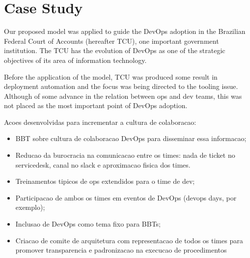 \section{Case Study}

Our proposed model was applied to guide the DevOps adoption in the Brazilian Federal Court of Accounts (hereafter TCU), one important government institution. The TCU has the evolution of DevOps as one of the strategic objectives of its area of information technology.

Before the application of the model, TCU was produced some result in deployment automation and the focus was being directed to the tooling issue. Although of some advance in the relation between ops and dev teams, this was not placed as the most important point of DevOps adoption.

Acoes desenvolvidas para incrementar a cultura de colaboracao:
\begin{itemize}
\item BBT sobre cultura de colaboracao DevOps para disseminar essa informacao;
\item Reducao da burocracia na comunicacao entre os times: nada de ticket no servicedesk, canal no slack e aproximacao fisica dos times.
\item Treinamentos tipicos de ops extendidos para o time de dev;
\item Participacao de ambos os times em eventos de DevOps (devops days, por exemplo);
\item Inclusao de DevOps como tema fixo para BBTs;
\item Criacao de comite de arquitetura com representacao de todos os times para promover transparencia e padronizacao na execucao de procedimentos
\end{itemize}
